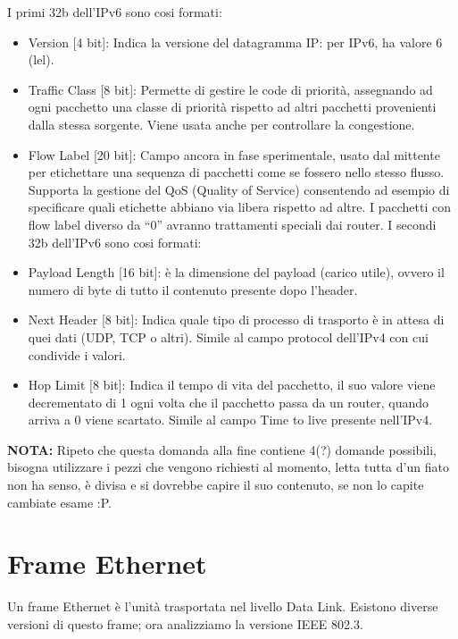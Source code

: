 I primi 32b dell’IPv6 sono cosi formati:
\begin{itemize}
\item	Version [4 bit]: Indica la versione del datagramma IP: per IPv6, ha valore 6 (lel).
\item	Traffic Class [8 bit]: Permette di gestire le code di priorità, assegnando ad ogni pacchetto una classe di priorità rispetto ad altri pacchetti provenienti dalla stessa sorgente. Viene usata anche per controllare la congestione.
\item	Flow Label [20 bit]: Campo ancora in fase sperimentale, usato dal mittente per etichettare una sequenza di pacchetti come se fossero nello stesso flusso. Supporta la gestione del QoS (Quality of Service) consentendo ad esempio di specificare quali etichette abbiano via libera rispetto ad altre. I pacchetti con flow label diverso da “0” avranno trattamenti speciali dai router.
I secondi 32b dell’IPv6 sono cosi formati:
\item	Payload Length [16 bit]: è la dimensione del payload (carico utile), ovvero il numero di byte di tutto il contenuto presente dopo l’header.
\item	Next Header [8 bit]: Indica quale tipo di processo di trasporto è in attesa di quei dati (UDP, TCP o altri). Simile al campo protocol dell’IPv4 con cui condivide i valori.
\item	Hop Limit [8 bit]: Indica il tempo di vita del pacchetto, il suo valore viene decrementato di 1 ogni volta che il pacchetto passa da un router, quando arriva a 0 viene scartato. Simile al campo Time to live presente nell’IPv4.
\end{itemize}

\textbf{NOTA:} Ripeto che questa domanda alla fine contiene 4(?) domande possibili, bisogna utilizzare i pezzi che vengono richiesti al momento, letta tutta d’un fiato non ha senso, è divisa e si dovrebbe capire il suo contenuto, se non lo capite cambiate esame :P.

\section{Frame Ethernet}

Un frame Ethernet è l’unità trasportata nel livello Data Link.
Esistono diverse versioni di questo frame; ora analizziamo la versione IEEE 802.3. 

